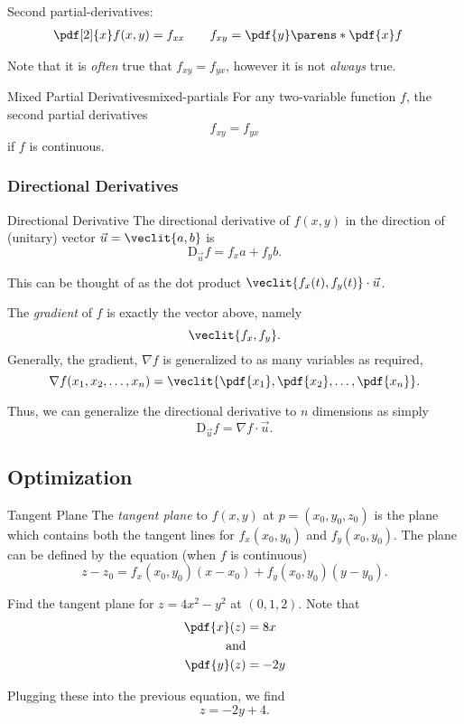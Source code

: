 \documentclass{article}
\begin{document}
Second partial-derivatives:
\begin{align*}
  \pdf[2]{x} f(x, y) = f_{xx} & \qquad f_{xy} = \pdf{y}\parens*{\pdf{x} f}
\end{align*}

Note that it is \textit{often} true that $f_{xy} = f_{yx}$, however it is not \textit{always} true.
\begin{thm}{Mixed Partial Derivatives}{mixed-partials}
  For any two-variable function $f$, the second partial derivatives
  \[
    f_{xy} = f_{yx}
  \]
  if $f$ is continuous.
\end{thm}

\subsubsection{Directional Derivatives}

\begin{defn}{Directional Derivative}{}
  The directional derivative of $f(x, y)$ in the direction of (unitary) vector $\vec{u} = \veclit{a, b}$ is
  \[
    \mathrm{D}_{\vec{u}}f = f_{x}a + f_{y}b.
  \]

  This can be thought of as the dot product $\veclit{f_{x}(t), f_{y}(t)} \cdot \vec{u}$.
\end{defn}

The \emph{gradient} of $f$ is exactly the vector above, namely
\[
  \veclit{f_{x}, f_{y}}.
\]
Generally, the gradient, $\nabla f$ is generalized to as many variables as required,
\[
  \nabla f(x_{1}, x_{2}, \ldots, x_{n}) = \veclit{\pdf{x_{1}}, \pdf{x_{2}}, \ldots, \pdf{x_{n}}}.
\]

Thus, we can generalize the directional derivative to $n$ dimensions as simply
\[
  \mathrm{D}_{\vec{u}}f = \nabla f \cdot \vec{u}.
\]

\subsection{Optimization}
\begin{defn}{Tangent Plane}{}
  The \emph{tangent plane} to $f(x, y)$ at $p = (x_{0}, y_{0}, z_{0})$ is the plane
  which contains both the tangent lines for $f_{x}(x_{0}, y_{0})$ and $f_{y}(x_{0}, y_{0})$.
  The plane can be defined by the equation (when $f$ is continuous)
  \[
    z - z_{0} = f_{x}(x_{0}, y_{0})(x - x_{0}) + f_{y}(x_{0}, y_{0})(y - y_{0}).
  \]
\end{defn}

\begin{ex}
  Find the tangent plane for $z = 4x^{2} - y^{2}$ at $(0, 1, 2)$.
  Note that
  \begin{align*}
    \pdf{x}(z) &= 8x\\
    \vspace{0.25mm}\textrm{and}\vspace{0.25mm}\\
    \pdf{y}(z) &= -2y
  \end{align*}

  Plugging these into the previous equation, we find
  \[
    z = -2y + 4.
  \]
\end{ex}
\end{document}
